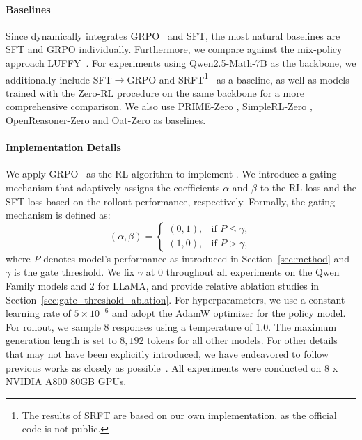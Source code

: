 \paragraph{Baselines}
Since \mot dynamically integrates GRPO~\citep{shao2024deepseekmath} and SFT, the most natural baselines are SFT and GRPO individually.
Furthermore, we compare \mot against the mix-policy approach LUFFY~\citep{yan2025learning}.
For experiments using Qwen2.5-Math-7B as the backbone, we additionally include SFT$\rightarrow$GRPO and SRFT\footnote{The results of SRFT are based on our own implementation, as the official code is not public.}~\citep{fu2025srft} as a baseline, as well as models trained with the Zero-RL procedure on the same backbone for a more comprehensive comparison. We also use PRIME-Zero \citep{cui2025process}, SimpleRL-Zero \citep{zeng2025simplerl}, OpenReasoner-Zero \citep{hu2025openreasonerzeroopensourceapproach} and Oat-Zero \citep{liu2025understanding} as baselines.


\paragraph{Implementation Details}
We apply GRPO~\citep{shao2024deepseekmath} as the RL algorithm to implement \mot.
We introduce a gating mechanism that adaptively assigns the coefficients $\alpha$ and $\beta$ to the RL loss and the SFT loss based on the rollout performance, respectively.
Formally, the gating mechanism is defined as:
\[
(\alpha, \beta) =
\begin{cases}
(0, 1), & \text{if } P \leq \gamma, \\[6pt]
(1, 0), & \text{if } P > \gamma,
\end{cases}
\]
where $P$ denotes model's performance as introduced in Section~\ref{sec:method} and $\gamma$ is the gate threshold.
We fix $\gamma$ at $0$ throughout all experiments on the Qwen Family models and $2$ for LLaMA, and provide relative ablation studies in Section~\ref{sec:gate_threshold_ablation}.
For hyperparameters, we use a constant learning rate of $5 \times 10^{-6}$ and adopt the AdamW optimizer for the policy model.
For rollout, we sample $8$ responses using a temperature of $1.0$.
The maximum generation length is set to $8,192$ tokens for all other models.
For other details that may not have been explicitly introduced, we have endeavored to follow previous works as closely as possible~\citep{zhao2025learning,zuo2025ttrl}.
All experiments were conducted on 8 x NVIDIA A800 80GB GPUs.


